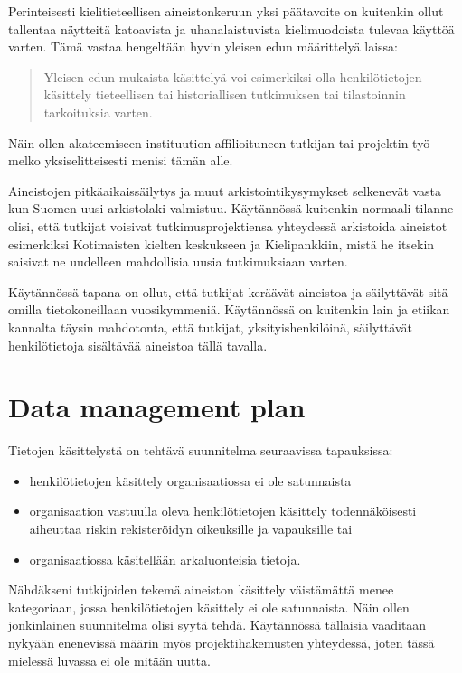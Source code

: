 \documentclass[]{book}
\providecommand{\tightlist}{%
  \setlength{\itemsep}{0pt}\setlength{\parskip}{0pt}}
\begin{document}
Perinteisesti kielitieteellisen aineistonkeruun yksi päätavoite on
kuitenkin ollut tallentaa näytteitä katoavista ja uhanalaistuvista
kielimuodoista tulevaa käyttöä varten. Tämä vastaa hengeltään hyvin
yleisen edun määrittelyä laissa:

\begin{quote}
Yleisen edun mukaista käsittelyä voi esimerkiksi olla henkilötietojen
käsittely tieteellisen tai historiallisen tutkimuksen tai tilastoinnin
tarkoituksia varten.
\end{quote}

Näin ollen akateemiseen instituution affilioituneen tutkijan tai
projektin työ melko yksiselitteisesti menisi tämän alle.

Aineistojen pitkäaikaissäilytys ja muut arkistointikysymykset selkenevät
vasta kun Suomen uusi arkistolaki valmistuu. Käytännössä kuitenkin
normaali tilanne olisi, että tutkijat voisivat tutkimusprojektiensa
yhteydessä arkistoida aineistot esimerkiksi Kotimaisten kielten
keskukseen ja Kielipankkiin, mistä he itsekin saisivat ne uudelleen
mahdollisia uusia tutkimuksiaan varten.

Käytännössä tapana on ollut, että tutkijat keräävät aineistoa ja
säilyttävät sitä omilla tietokoneillaan vuosikymmeniä. Käytännössä on
kuitenkin lain ja etiikan kannalta täysin mahdotonta, että tutkijat,
yksityishenkilöinä, säilyttävät henkilötietoja sisältävää aineistoa
tällä tavalla.

\hypertarget{data-management-plan}{%
\section{Data management plan}\label{data-management-plan}}

Tietojen käsittelystä on tehtävä suunnitelma seuraavissa tapauksissa:

\begin{itemize}
\tightlist
\item
  henkilötietojen käsittely organisaatiossa ei ole satunnaista
\item
  organisaation vastuulla oleva henkilötietojen käsittely
  todennäköisesti aiheuttaa riskin rekisteröidyn oikeuksille ja
  vapauksille tai
\item
  organisaatiossa käsitellään arkaluonteisia tietoja.
\end{itemize}

Nähdäkseni tutkijoiden tekemä aineiston käsittely väistämättä menee
kategoriaan, jossa henkilötietojen käsittely ei ole satunnaista. Näin
ollen jonkinlainen suunnitelma olisi syytä tehdä. Käytännössä tällaisia
vaaditaan nykyään enenevissä määrin myös projektihakemusten yhteydessä,
joten tässä mielessä luvassa ei ole mitään uutta.
\end{document}
